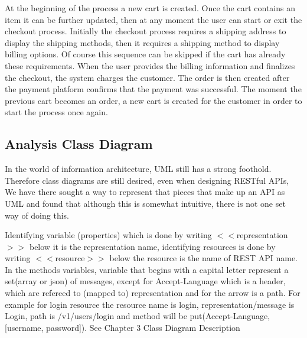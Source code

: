 At the beginning of the process a new cart is created. Once the cart contains an item it can be further updated, then at any moment the user can start or exit the checkout process. Initially the checkout process requires a shipping address to display the shipping methods, then it requires a shipping method to display billing options. Of course this sequence can be skipped if the cart has already these requirements.
When the user provides the billing information and finalizes the checkout, the system charges the customer. The order is then created after the payment platform confirms that the payment was successful. The moment the previous cart becomes an order, a new cart is created for the customer in order to start the process once again.


\subsection{Analysis Class Diagram}
In the world of information architecture, UML still has a strong foothold. Therefore class diagrams are still desired, even when designing RESTful APIs, We have there sought a way to represent that pieces that make up an 	API as UML and found that although this is somewhat intuitive, there is not one set way of doing this.

Identifying variable (properties) which is done by writing $<<$representation$>>$ below it is the representation name, identifying resources is done by writing $<<$resource$>>$ below the resource is the name of REST API name. In the methods variables, variable that begins with a capital letter represent a set(array or json) of messages, except for Accept-Language which is a header, which are refereed to (mapped to) representation and for the arrow is a path. For example for login resource the resource name is login, representation/message is Login, path is /v1/users/login and method will be put(Accept-Language, [username, password]). See Chapter 3 Class Diagram Description




